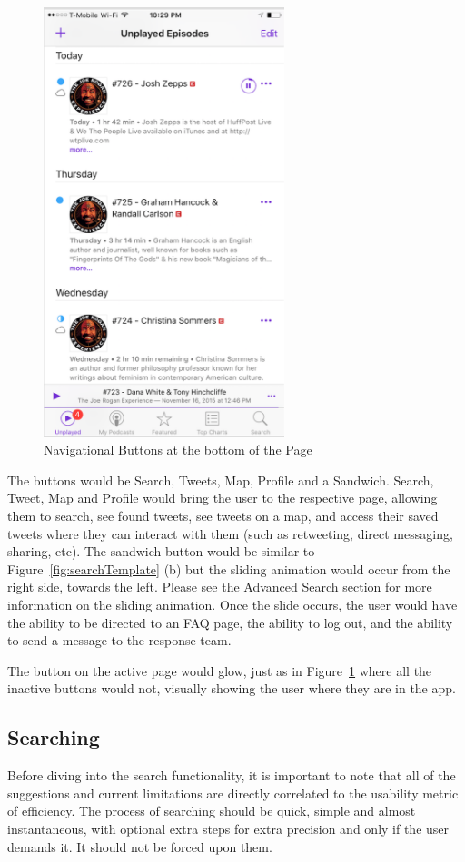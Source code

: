 \documentclass[11pt]{article}
\begin{document}
\begin{figure}[H]
    \centering
    \includegraphics[width=7cm]{navButton}
    \caption{Navigational Buttons at the bottom of the Page}
    \label{fig:navButtons}                
\end{figure}

The buttons would be Search, Tweets, Map, Profile and a Sandwich. Search, Tweet, Map and Profile would bring the user to the respective page, allowing them to search, see found tweets, see tweets on a map, and access their saved tweets where they can interact with them (such as retweeting, direct messaging, sharing, etc). The sandwich button would be similar to Figure~\ref{fig:searchTemplate} (b) but the sliding animation would occur from the right side, towards the left. Please see the Advanced Search section for more information on the sliding animation. Once the slide occurs, the user would have the ability to be directed to an FAQ page, the ability to log out, and the ability to send a message to the response team.

The button on the active page would glow, just as in Figure~\ref{fig:navButtons} where all the inactive buttons would not, visually showing the user where they are in the app.

\subsection{Searching}
Before diving into the search functionality, it is important to note that all of the suggestions and current limitations are directly correlated to the usability metric of efficiency. The process of searching should be quick, simple and almost instantaneous, with optional extra steps for extra precision and only if the user demands it. It should not be forced upon them.
\end{document}
